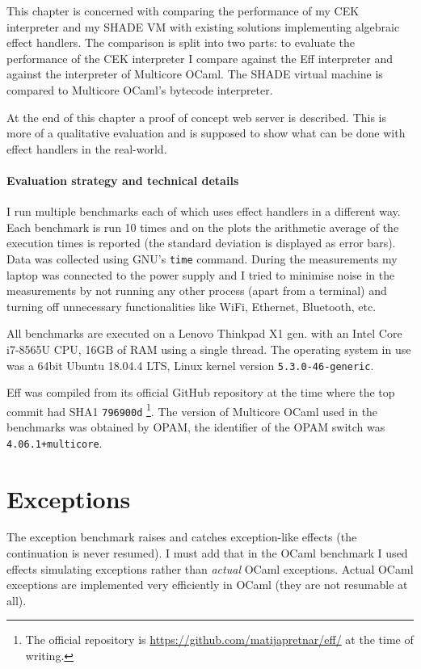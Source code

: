 \documentclass[class=article, crop=false]{standalone}
\begin{document}
This chapter is concerned with comparing the performance of my CEK interpreter
and my SHADE VM with existing solutions implementing algebraic effect handlers.
The comparison is split into two parts: to evaluate the performance of the
CEK interpreter I compare against the Eff interpreter and against the interpreter
of Multicore OCaml. The SHADE virtual machine is compared to Multicore OCaml's
bytecode interpreter.

At the end of this chapter a proof of concept web server is described. This is
more of a qualitative evaluation and is supposed to show what can be done 
with effect handlers in the real-world.

\paragraph{Evaluation strategy and technical details}

I run multiple benchmarks each of which uses effect handlers in a different
way. Each benchmark is run 10 times and on the plots the arithmetic average of
the execution times is reported (the standard deviation is displayed as error
bars). Data was collected using GNU's \verb|time| command. During the measurements
my laptop was connected to the power supply and I tried to minimise noise in the measurements
by not running any other process (apart from a terminal) and turning off
unnecessary functionalities like WiFi, Ethernet, Bluetooth, etc.

All benchmarks are executed on a Lenovo Thinkpad X1  gen. with an Intel
Core i7-8565U CPU, 16GB of RAM using a single thread. The operating system in
use was a 64bit Ubuntu 18.04.4 LTS, Linux kernel version \verb|5.3.0-46-generic|.

Eff was compiled from its official GitHub repository at the time where the top
commit had SHA1 \verb|796900d|%
\footnote{The official repository is
\url{https://github.com/matijapretnar/eff/} at the time of writing.}.
The version of Multicore OCaml used in the benchmarks was obtained by OPAM, the
identifier of the OPAM switch was \verb|4.06.1+multicore|.

\section{Exceptions}

The exception benchmark raises and catches exception-like effects (the
continuation is never resumed). I must add that in the OCaml benchmark I used
effects simulating exceptions rather than \emph{actual} OCaml exceptions. Actual
OCaml exceptions are implemented very efficiently in OCaml (they are not
resumable at all).
\end{document}
